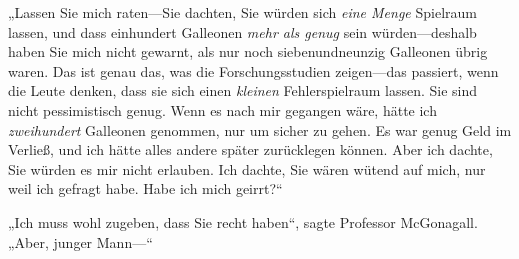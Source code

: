 „Lassen Sie mich raten—Sie dachten, Sie würden sich \emph{eine Menge} Spielraum lassen, und dass einhundert Galleonen \emph{mehr als genug} sein würden—deshalb haben Sie mich nicht gewarnt, als nur noch siebenundneunzig Galleonen übrig waren. Das ist genau das, was die Forschungsstudien zeigen—das passiert, wenn die Leute denken, dass sie sich einen \emph{kleinen} Fehlerspielraum lassen. Sie sind nicht pessimistisch genug. Wenn es nach mir gegangen wäre, hätte ich \emph{zweihundert} Galleonen genommen, nur um sicher zu gehen. Es war genug Geld im Verließ, und ich hätte alles andere später zurücklegen können. Aber ich dachte, Sie würden es mir nicht erlauben. Ich dachte, Sie wären wütend auf mich, nur weil ich gefragt habe. Habe ich mich geirrt?“

„Ich muss wohl zugeben, dass Sie recht haben“, sagte Professor McGonagall. „Aber, junger Mann—“

